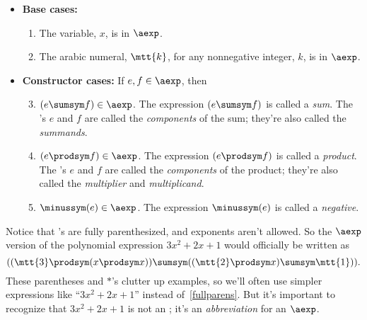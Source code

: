 \begin{definition}

\begin{itemize}
\item \textbf{Base cases:}

\begin{enumerate}

\item The variable, $x$, is in $\aexp$.

\item The arabic numeral, $\mtt{k}$, for any nonnegative integer, $k$, is
  in $\aexp$.

\end{enumerate}

\item \textbf{Constructor cases:} If $e,f \in \aexp$, then
\begin{enumerate}
\setcounter{enumi}{2}

\item $(e \sumsym f) \in \aexp$.  The expression $(e \sumsym f)$ is called a
  \emph{sum}.  The \aexp's $e$ and $f$ are called the \emph{components} of
  the sum; they're also called the \emph{summands}.

\item $(e \prodsym f) \in \aexp$.  The expression $(e \prodsym f)$ is called a
  \emph{product}.  The \aexp's $e$ and $f$ are called the
  \emph{components} of the product; they're also called the
  \emph{multiplier} and \emph{multiplicand}.

\item $\minussym(e) \in \aexp$.  The expression $\minussym(e)$ is called a
  \emph{negative}.
\end{enumerate}
\end{itemize}
\end{definition}

Notice that \aexp's are fully parenthesized, and exponents aren't allowed.
So the $\aexp$ version of the polynomial expression $3x^2 + 2x + 1$ would
officially be written as
\begin{equation}\label{fullparens}
((\mtt{3} \prodsym (x \prodsym x)) \sumsym ((\mtt{2} \prodsym x) \sumsym \mtt{1})).
\end{equation}
These parentheses and $\ast$'s clutter up examples, so we'll often use
simpler expressions like ``$3x^2 + 2x + 1$'' instead
of~\eqref{fullparens}.  But it's important to recognize that $3x^2 +
2x + 1$ is not an \aexp; it's an \emph{abbreviation} for an $\aexp$.

